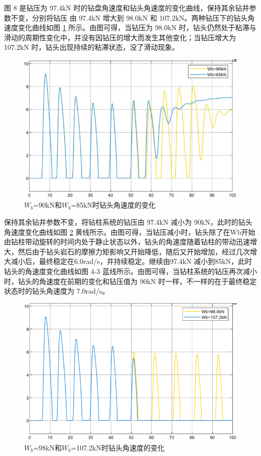 \documentclass[12pt,hyperref,a4paper,UTF8]{ctexart}
\begin{document}
	图 8 是钻压为 97.4kN 时的钻盘角速度和钻头角速度的变化曲线，保持其余钻井参数不变，分别将钻压 由 97.4kN 增大到 98.0kN 和 107.2kN。两种钻压下的钻头角速度变化曲线如图 \ref{fig:W_b=90kN和W_b=85kN 时钻头角速度的变化} 所示。由图可得，当钻压为 98.0kN 时，钻头仍然处于粘滞与滑动的周期性变化中，并没有因钻压的增大而发生其他变化；当钻压增大为 107.2kN 时，钻头出现持续的粘滞状态，没了滑动现象。
	
\begin{figure}[!htbp]
	\centering
	\includegraphics[width=0.6\linewidth]{figures/W_b=90kN和W_b=85kN 时钻头角速度的变化}
	\caption{$W_b$=90kN和$W_b$=85kN时钻头角速度的变化}
	\label{fig:W_b=90kN和W_b=85kN 时钻头角速度的变化}
\end{figure}
	
	
	
	
	保持其余钻井参数不变，将钻柱系统的钻压由 97.4kN 减小为 90kN，此时的钻头角速度变化曲线如图 \ref{fig:W_b=98kN和W_b=107.2kN 时钻头角速度的变化} 黄线所示。由图可得，当钻压减小时，钻头除了在Wb开始由钻柱带动旋转的时间内处于静止状态以外，钻头的角速度随着钻柱的带动迅速增大，然后由于钻头岩石的摩擦力矩影响又开始降低，随后又开始增加，经过几次增大减小后，最终稳定在6.0rad/s，并持续稳定。继续由97.4kN 减小到85kN，此时钻头的角速度变化曲线如图 4-3 蓝线所示。由图可得，当钻柱系统的钻压再次减小时，钻头的角速度在前期的变化和钻压值为 90kN 时一样，不一样的在于最终稳定状态时的钻头角速度为 7.0rad/s。
	
		\begin{figure}[!htbp]
		\centering
		\includegraphics[width=0.6\linewidth]{figures/W_b=98kN和W_b=107.2kN 时钻头角速度的变化}
		\caption{$W_b$=98kN和$W_b$=107.2kN时钻头角速度的变化}
		\label{fig:W_b=98kN和W_b=107.2kN 时钻头角速度的变化}
	\end{figure}
	
\end{document}
